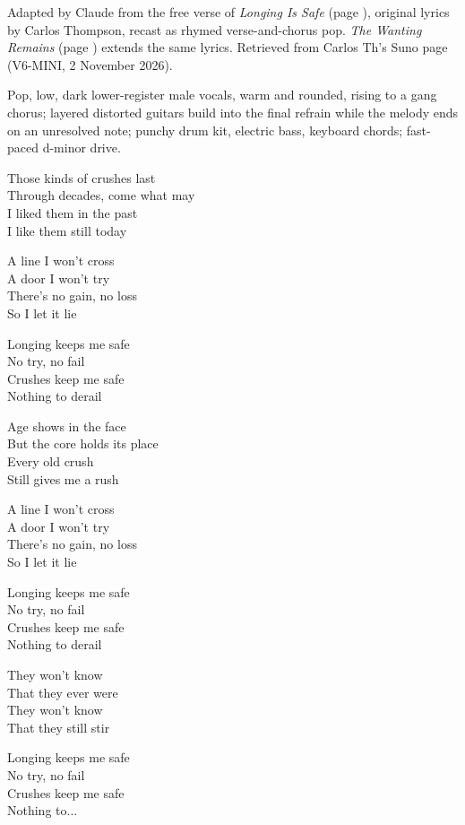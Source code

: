 
\label{sec:those-kinds-of-crushes}
\begin{notes}
Adapted by Claude from the free verse of \emph{Longing Is Safe} (page \pageref{sec:longing-is-safe}), original lyrics by Carlos Thompson, recast as rhymed verse-and-chorus pop. \emph{The Wanting Remains} (page \pageref{sec:the-wanting-remains}) extends the same lyrics. Retrieved from Carlos Th's Suno page (V6-MINI, 2 November 2026).
\end{notes}
\begin{style}
Pop, low, dark lower-register male vocals, warm and rounded, rising to a gang chorus; layered distorted guitars build into the final refrain while the melody ends on an unresolved note; punchy drum kit, electric bass, keyboard chords; fast-paced d-minor drive.
\end{style}
\begin{lyrics}
Those kinds of crushes last\\
Through decades, come what may\\
I liked them in the past\\
I like them still today

A line I won’t cross\\
A door I won’t try\\
There’s no gain, no loss\\
So I let it lie

Longing keeps me safe\\
No try, no fail\\
Crushes keep me safe\\
Nothing to derail

Age shows in the face\\
But the core holds its place\\
Every old crush\\
Still gives me a rush

A line I won’t cross\\
A door I won’t try\\
There’s no gain, no loss\\
So I let it lie

Longing keeps me safe\\
No try, no fail\\
Crushes keep me safe\\
Nothing to derail

They won’t know\\
That they ever were\\
They won’t know\\
That they still stir

Longing keeps me safe\\
No try, no fail\\
Crushes keep me safe\\
Nothing to...
\end{lyrics}

